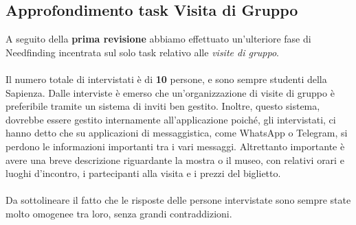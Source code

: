 \subsection{Approfondimento task Visita di Gruppo}

A seguito della \textbf{prima revisione} abbiamo effettuato un'ulteriore fase di Needfinding incentrata sul solo task relativo alle \textit{visite di gruppo}.

\paragraph{}
Il numero totale di intervistati è di \textbf{10} persone, e sono sempre studenti della Sapienza. Dalle interviste è emerso che un'organizzazione di visite di gruppo è preferibile tramite un sistema di inviti ben gestito. Inoltre, questo sistema, dovrebbe essere gestito internamente all'applicazione poiché, gli intervistati, ci hanno detto che su applicazioni di messaggistica, come WhatsApp o Telegram, si perdono le informazioni importanti tra i vari messaggi.
\newline
Altrettanto importante è avere una breve descrizione riguardante la mostra o il museo, con relativi orari e luoghi d'incontro, i partecipanti alla visita e i prezzi del biglietto.

\paragraph{}
Da sottolineare il fatto che le risposte delle persone intervistate sono sempre state molto omogenee tra loro, senza grandi contraddizioni.